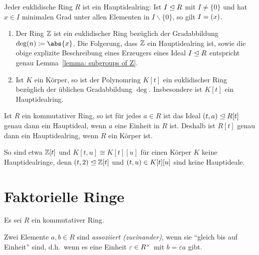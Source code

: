 \begin{lemma}
  Jeder euklidische Ring $R$ ist ein Hauptidealring:
  Ist $I \mathrel{\trianglelefteq} R$ mit $I \neq \{0\}$ und hat $x \in I$ minimalen Grad unter allen Elementen in $I \smallsetminus \{0\}$, so gilt $I = (x)$.
\end{lemma}

\begin{example}
  \begin{enumerate}
    \item
      Der Ring $\mathbb{Z}$ ist ein euklidischer Ring bezüglich der Gradabbildung $\deg(n) \defined \abs{x}$.
      Die Folgerung, dass $\mathbb{Z}$ ein Hauptidealring ist, sowie die obige explizite Beschreibung eines Erzeugers eines Ideal $I \mathrel{\trianglelefteq} R$ entspricht genau Lemma~\ref{lemma: subgroups of Z}.
    \item
      Ist $K$ ein Körper, so ist der Polynomring $K[t]$ ein euklidischer Ring bezüglich der üblichen Gradabbildung $\deg$.
      Insbesondere ist $K[t]$ ein Hauptidealring.
  \end{enumerate}
\end{example}

\begin{remark}
  Ist $R$ ein kommutativer Ring, so ist für jedes $a \in R$ ist das Ideal $(t, a) \mathrel{\trianglelefteq} R[t]$ genau dann ein Hauptideal, wenn $a$ eine Einheit in $R$ ist.
  Deshalb ist $R[t]$ genau dann ein Hauptidealring, wenn $R$ ein Körper ist.
  
  So sind etwa $\mathbb{Z}[t]$ und $K[t,u] \cong K[t][u]$ für einen Körper $K$ keine Hauptidealringe, denn $(t, 2) \mathrel{\trianglelefteq} \mathbb{Z}[t]$ und $(t, u) \in K[t][u]$ sind keine Hauptideale.
\end{remark}









\section{Faktorielle Ringe}

Es sei $R$ ein kommutativer Ring.

\begin{definition}
  Zwei Elemente $a, b \in R$ sind \emph{assoziiert \textup(zueinander\textup)}, wenn sie \enquote{gleich bis auf Einheit} sind, d.h.\ wenn es eine Einheit $\varepsilon \in R^{\times}$ mit $b = \varepsilon a$ gibt.
\end{definition}

